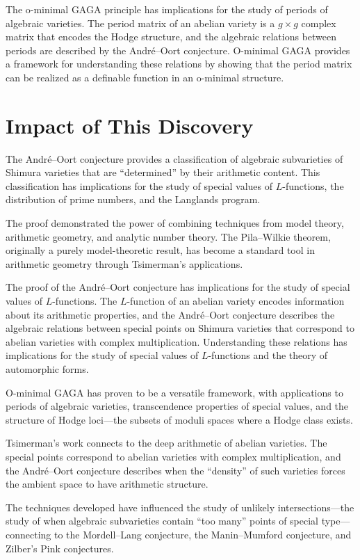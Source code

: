 The o-minimal GAGA principle has implications for the study of periods of algebraic varieties. The period matrix of an abelian variety is a $g \times g$ complex matrix that encodes the Hodge structure, and the algebraic relations between periods are described by the Andr\'{e}--Oort conjecture. O-minimal GAGA provides a framework for understanding these relations by showing that the period matrix can be realized as a definable function in an o-minimal structure.

\section{Impact of This Discovery}

The Andr\'{e}--Oort conjecture provides a classification of algebraic subvarieties of Shimura varieties that are ``determined'' by their arithmetic content. This classification has implications for the study of special values of $L$-functions, the distribution of prime numbers, and the Langlands program.

The proof demonstrated the power of combining techniques from model theory, arithmetic geometry, and analytic number theory. The Pila--Wilkie theorem, originally a purely model-theoretic result, has become a standard tool in arithmetic geometry through Tsimerman's applications.

The proof of the Andr\'{e}--Oort conjecture has implications for the study of special values of $L$-functions. The $L$-function of an abelian variety encodes information about its arithmetic properties, and the Andr\'{e}--Oort conjecture describes the algebraic relations between special points on Shimura varieties that correspond to abelian varieties with complex multiplication. Understanding these relations has implications for the study of special values of $L$-functions and the theory of automorphic forms.

O-minimal GAGA has proven to be a versatile framework, with applications to periods of algebraic varieties, transcendence properties of special values, and the structure of Hodge loci---the subsets of moduli spaces where a Hodge class exists.

Tsimerman's work connects to the deep arithmetic of abelian varieties. The special points correspond to abelian varieties with complex multiplication, and the Andr\'{e}--Oort conjecture describes when the ``density'' of such varieties forces the ambient space to have arithmetic structure.

The techniques developed have influenced the study of unlikely intersections---the study of when algebraic subvarieties contain ``too many'' points of special type---connecting to the Mordell--Lang conjecture, the Manin--Mumford conjecture, and Zilber's Pink conjectures.

